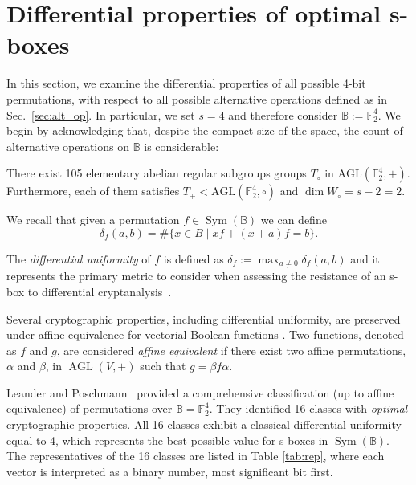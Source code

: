 \documentclass[runningheads,a4paper,english]{llncs}
\newcommand{\F}{\mathbb{F}}
\DeclareMathOperator{\AGL}{AGL}
\DeclareMathOperator{\sym}{Sym}
\renewcommand{\b}{\textbf{b}}
\newcommand{\RI}[1]{\textcolor{red}{{\sf (Riccardo: }{\sl{#1})}}}
\begin{document}
\section{Differential properties of optimal s-boxes}
\label{sec:sboxes}

In this section, we examine the differential properties of all possible 4-bit permutations, with respect to all possible alternative operations defined as in Sec.~\ref{sec:alt_op}. In particular, we set $s=4$ and therefore consider $\mathbb B:= \mathbb F_2^4$. We begin by acknowledging that, despite the compact size of the space, the count of alternative operations on $\mathbb B$ is considerable: 

\begin{proposition}\label{prop:dim4alt}
    There exist 105 elementary abelian regular subgroups groups $T_\circ$ in $\mathrm{AGL}(\mathbb{F}_2^4,+)$. Furthermore,  each of them satisfies $T_+<\mathrm{AGL}(\mathbb{F}_2^4,\circ)$ and $\dim W_\circ=s-2=2$.
\end{proposition}

We recall that given a permutation $f\in \sym(\mathbb B)$ we can define \[\delta_f(a,b)=\#\{x \in B\mid xf+(x+a)f=b\}.\] 

The \emph{differential uniformity} of $f$ is defined as $\delta_f:=\max_{a\ne 0}\delta_f(a,b)$ and it represents the primary metric to consider when assessing the resistance of an s-box to differential cryptanalysis~\cite{nyberg1993differentially}.


Several cryptographic properties, including differential uniformity, are preserved under affine equivalence for vectorial Boolean functions \cite{carlet2021boolean}.
Two functions, denoted as $f$ and $g$, are considered \emph{affine equivalent} if there exist two affine permutations, $\alpha$ and $\beta$, in $\AGL(V,+)$ such that $g = \beta  f  \alpha$.

Leander and Poschmann~\cite{leander2007classification} provided a comprehensive classification (up to affine equivalence) of permutations over $\mathbb B= \mathbb F_2^4$. They identified 16 classes with \emph{optimal} cryptographic properties. All 16 classes exhibit a classical differential uniformity equal to 4, which represents the best possible value for s-boxes in $\sym(\mathbb B)$. The representatives of the 16 classes are listed in Table \ref{tab:rep}, where each vector is interpreted as a binary number, most significant bit first.
\end{document}
